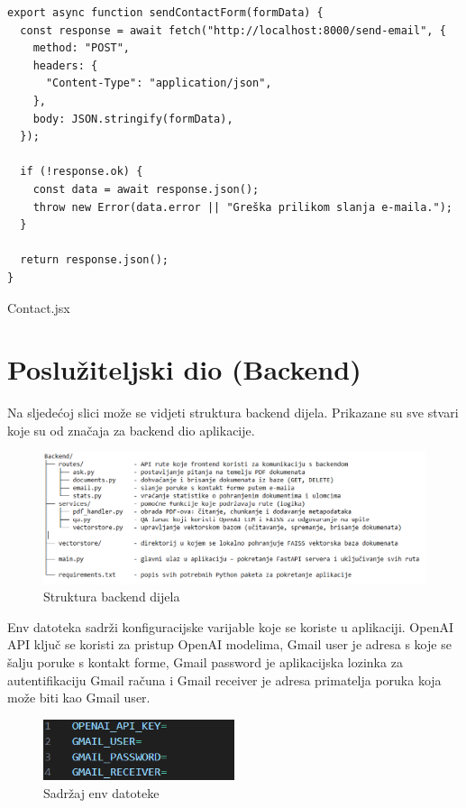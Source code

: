 \documentclass[]{foi}
\begin{document}
\begin{longlisting}
\begin{verbatim}
export async function sendContactForm(formData) {
  const response = await fetch("http://localhost:8000/send-email", {
    method: "POST",
    headers: {
      "Content-Type": "application/json",
    },
    body: JSON.stringify(formData),
  });

  if (!response.ok) {
    const data = await response.json();
    throw new Error(data.error || "Greška prilikom slanja e-maila.");
  }

  return response.json();
}
\end{verbatim}
\caption{Contact.jsx}
\label{lst:contact}
\end{longlisting}


\section{Poslužiteljski dio (Backend)}
Na sljedećoj slici može se vidjeti struktura backend dijela. Prikazane su sve stvari koje su od značaja za backend dio aplikacije.
\begin{figure}[ht!]
    \centering
    \includegraphics[width=1\textwidth]{./assets/backendstructure.png}
    \caption{Struktura backend dijela}
    \label{fig:slika111}
\end{figure}

Env datoteka sadrži konfiguracijske varijable koje se koriste u aplikaciji. OpenAI API ključ se koristi za pristup OpenAI modelima,
Gmail user je adresa s koje se šalju poruke s kontakt forme, Gmail password je aplikacijska lozinka za autentifikaciju Gmail računa i Gmail receiver
je adresa primatelja poruka koja može biti kao Gmail user.

\begin{figure}[h]
  \centering
  \includegraphics[width=0.5\textwidth]{./assets/env file.png}
  \caption{Sadržaj env datoteke}
  \label{fig:slika121}
\end{figure}
\end{document}
